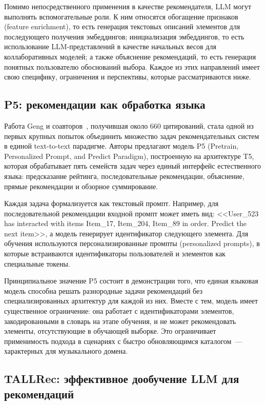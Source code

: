 Помимо непосредственного применения в качестве рекомендателя, LLM могут выполнять вспомогательные роли. К ним относятся обогащение признаков (feature enrichment), то есть генерация текстовых описаний элементов для последующего получения эмбеддингов; инициализация эмбеддингов, то есть использование LLM-представлений в качестве начальных весов для коллаборативных моделей; а также объяснение рекомендаций, то есть генерация понятных пользователю обоснований выбора. Каждое из этих направлений имеет свою специфику, ограничения и перспективы, которые рассматриваются ниже.

\subsection{P5: рекомендации как обработка языка}

Работа Geng и соавторов~\cite{geng2022p5}, получившая около 660 цитирований, стала одной из первых крупных попыток объединить множество задач рекомендательных систем в единой text-to-text парадигме. Авторы предлагают модель P5 (Pretrain, Personalized Prompt, and Predict Paradigm), построенную на архитектуре T5, которая обрабатывает пять семейств задач через единый интерфейс естественного языка: предсказание рейтинга, последовательные рекомендации, объяснение, прямые рекомендации и обзорное суммирование.

Каждая задача формализуется как текстовый промпт. Например, для последовательной рекомендации входной промпт может иметь вид: <<User\_523 has interacted with items Item\_17, Item\_204, Item\_89 in order. Predict the next item>>, а модель генерирует идентификатор следующего элемента. Для обучения используются персонализированные промпты (personalized prompts), в которые встраиваются идентификаторы пользователей и элементов как специальные токены.

Принципиальное значение P5 состоит в демонстрации того, что единая языковая модель способна решать разнородные задачи рекомендаций без специализированных архитектур для каждой из них. Вместе с тем, модель имеет существенное ограничение: она работает с идентификаторами элементов, закодированными в словарь на этапе обучения, и не может рекомендовать элементы, отсутствующие в обучающей выборке. Это ограничивает применимость подхода в сценариях с быстро обновляющимся каталогом~--- характерных для музыкального домена.

\subsection{TALLRec: эффективное дообучение LLM для рекомендаций}

